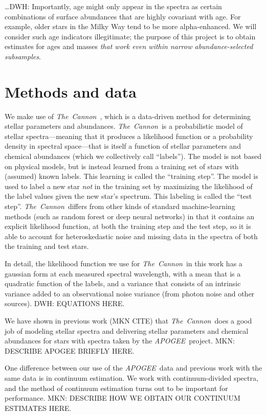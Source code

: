 \documentclass[12pt, preprint]{aastex}
\newcommand{\project}[1]{\textsl{#1}}
\newcommand{\tc}{\project{The~Cannon}}
\newcommand{\apogee}{\project{APOGEE}}
\begin{document}
\ldots DWH: Importantly, age might only appear in the spectra as
certain combinations of surface abundances that are highly covariant
with age.  For example, older stars in the Milky Way tend to be more
alpha-enhanced.  We will consider such age indicators illegitimate;
the purpose of this project is to obtain estimates for ages and masses
\emph{that work even within narrow abundance-selected subsamples}.

\section{Methods and data}

We make use of \tc\ \citep{Ness2015}, which is a data-driven method for
determining stellar parameters and abundances.
\tc\ is a probabilistic model of stellar spectra---meaning that it
produces a likelihood function or a probability density in spectral
space---that is itself a function of stellar parameters and chemical
abundances (which we collectively call ``labels'').
The model is not based on physical models, but is instead learned
from a training set of stars with (assumed) known labels.
This learning is called the ``training step''.
The model is used to label a new star \emph{not} in the training set
by maximizing the likelihood of the label values given the new star's
spectrum.
This labeling is called the ``test step''.
\tc\ differs from other kinds of standard machine-learning methods
(such as random forest or deep neural networks) in that it contains an
explicit likelihood function, at both the training step and the test
step, so it is able to account for heteroskedastic noise and missing
data in the spectra of both the training and test stars.

In detail, the likelihood function we use for \tc\ in this work has a
gaussian form at each measured spectral wavelength, with a mean that
is a quadratic function of the labels, and a variance that consists of
an intrinsic variance added to an observational noise variance (from
photon noise and other sources).
DWH: EQUATIONS HERE.

We have shown in previous work (MKN CITE) that \tc\ does a good job
of modeling stellar spectra and delivering stellar parameters and
chemical abundances for stars with spectra taken by the \apogee\ project.
MKN: DESCRIBE APOGEE BRIEFLY HERE.

One difference between our use of the \apogee\ data and previous work
with the same data is in continuum estimation.
We work with continuum-divided spectra, and the method of continuum
estimation turns out to be important for performance.
MKN: DESCRIBE HOW WE OBTAIN OUR CONTINUUM ESTIMATES HERE.
\end{document}
